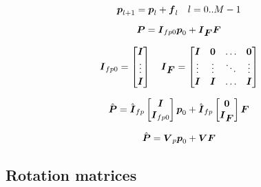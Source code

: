 \documentclass[12pt,a4paper]{article}
\begin{document}
\begin{equation*}
    \fp_{l+1} = \fp_l + \fd_{l}
    \quad
    l = 0..M-1
\end{equation*}

\begin{equation*}
    \FP = 
    \M{I}_{fp0}
    \fp_0 
    + 
    \M{I}_{\FD}
    \FD
\end{equation*}

\begin{equation*}
    \M{I}_{fp0} = 
    \begin{bmatrix}
        \M{I}\\
        \vdots\\
        \M{I}\\
    \end{bmatrix}
    \quad
    \M{I}_{\FD} = 
    \begin{bmatrix}
        \V{I}   &   \V{0}   & \dots     & \V{0} \\
        \vdots  &   \vdots  & \ddots    & \vdots \\
        \V{I}   &   \V{I}   & \dots     & \V{I} \\
    \end{bmatrix}
\end{equation*}

\begin{equation*}
    \FPh = 
    \hat{\M{I}}_{fp}
    \begin{bmatrix}
        \M{I} \\
        \M{I}_{fp0}\\
    \end{bmatrix} 
    \fp_0 
    + 
    \hat{\M{I}}_{fp}
    \begin{bmatrix}
        \M{0} \\
        \M{I}_{\FD} \\
    \end{bmatrix} 
    \FD
\end{equation*}

\begin{equation*}
    \FPh = 
    \M{V}_p
    \fp_0 
    + 
    \M{V}
    \FD
\end{equation*}


\subsection{Rotation matrices}
\end{document}
